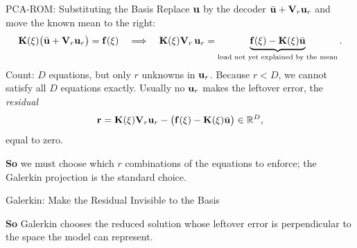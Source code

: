 \documentclass[10pt,aspectratio=169]{ntuabeamer}
\newcommand{\takeaway}[1]{\par\vspace{0.7em}\textcolor{ntuablue}{\textbf{So} #1}\par}
\begin{document}
\begin{frame}{PCA-ROM: Substituting the Basis}
  \small
  Replace \(\mathbf{u}\) by the decoder \(\bar{\mathbf{u}}+\mathbf{V}_r\mathbf{u}_r\) and move the known mean to the right:
  \[
    \mathbf{K}(\xi)\bigl(\bar{\mathbf{u}}+\mathbf{V}_r\mathbf{u}_r\bigr)=\mathbf{f}(\xi)
    \quad\Longrightarrow\quad
    \mathbf{K}(\xi)\mathbf{V}_r\,\mathbf{u}_r
    =
    \underbrace{\mathbf{f}(\xi)-\mathbf{K}(\xi)\bar{\mathbf{u}}}_{\text{load not yet explained by the mean}} .
  \]
  Count: \(D\) equations, but only \(r\) unknowns in \(\mathbf{u}_r\).
  Because \(r<D\), we cannot satisfy all \(D\) equations exactly. Usually no \(\mathbf{u}_r\) makes the leftover error, the
  \emph{residual}
  \[
    \mathbf{r}=\mathbf{K}(\xi)\mathbf{V}_r\mathbf{u}_r-\bigl(\mathbf{f}(\xi)-\mathbf{K}(\xi)\bar{\mathbf{u}}\bigr)\in\mathbb{R}^{D},
  \]
  equal to zero.

  \takeaway{we must choose which \(r\) combinations of the equations to enforce; the Galerkin projection is the standard choice.}
\end{frame}

\begin{frame}{Galerkin: Make the Residual Invisible to the Basis}
  \small
  {
    \begin{center}
    \end{center}
  }

  \takeaway{Galerkin chooses the reduced solution whose leftover error is perpendicular to the space the model can represent.}
\end{frame}
\end{document}
